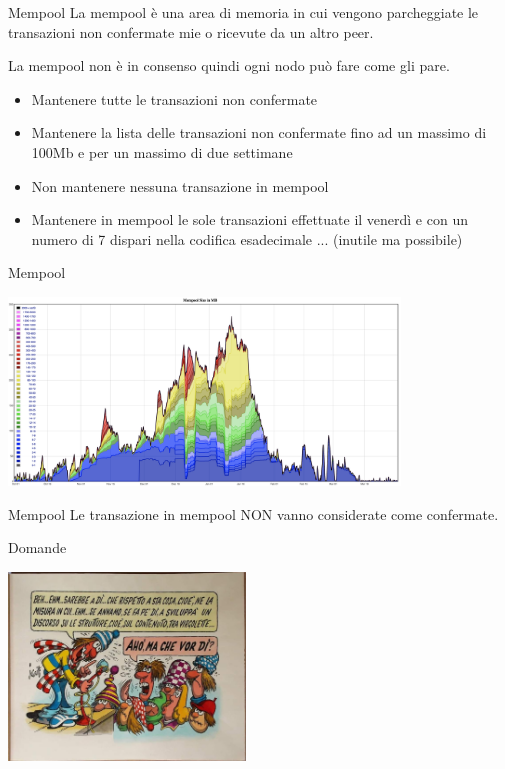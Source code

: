 \documentclass[aspectratio=169]{beamer}
\begin{document}
\begin{frame}{Mempool}
    La mempool è una area di memoria in cui vengono parcheggiate le transazioni non confermate mie o ricevute da un altro peer.

    La mempool non è in consenso quindi ogni nodo può fare come gli pare.

    \begin{itemize}
        \item Mantenere tutte le transazioni non confermate
        \item Mantenere la lista delle transazioni non confermate fino ad un massimo di 100Mb e per un massimo di due settimane
        \item Non mantenere nessuna transazione in mempool
        \item Mantenere in mempool le sole transazioni effettuate il venerdì e con un numero di 7 dispari nella codifica esadecimale ... (inutile ma possibile)
    \end{itemize}
\end{frame}

\begin{frame}{Mempool}
    \begin{center}
        \includegraphics[height=5cm]{mempool.png}
    \end{center}
\end{frame}

\begin{frame}{Mempool}
    Le transazione in mempool NON vanno considerate come confermate.
\end{frame}




\begin{frame}{Domande} 
    \begin{center}
        \includegraphics[height=5cm]{domande.jpg}
    \end{center}
\end{frame}
\end{document}

